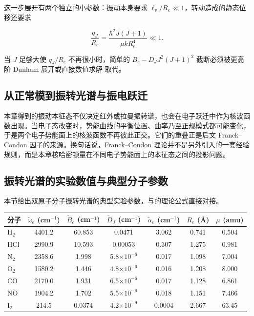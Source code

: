 这一步展开有两个独立的小参数：振动本身要求 \(\ell_v/R_e\ll1\)，转动造成的静态位移还要求

\begin{equation}
\frac{q_J}{R_e}
=\frac{\hbar^2J(J+1)}{\mu kR_e^4}\ll1.
\label{eq:centrifugal-control-parameter}
\end{equation}

当 \(J\) 足够大使 \(q_J/R_e\) 不再很小时，简单的 \(B_e-D_JJ^2(J+1)^2\) 截断必须被更高阶 Dunham 展开或直接数值求解  取代。

\subsection{从正常模到振转光谱与振电跃迁}

本章得到的振动本征态不仅决定红外或拉曼振转谱，也会在电子跃迁中作为核波函数出现。当电子态改变时，势能曲线的平衡位置、曲率乃至正规模式都可能变化，于是两个电子势能面上的核波函数不再彼此正交。它们的重叠正是后文 Franck--Condon 因子的来源。换句话说，Franck--Condon 理论并不是另外引入的一套经验规则，而是本章核哈密顿量在不同电子势能面上的本征态之间的投影问题。

\subsection{振转光谱的实验数值与典型分子参数}\label{sec:rovib-experiments}

本节给出双原子分子振转光谱的典型实验参数，与的理论公式直接对接。

\begin{center}
\begin{tabular}{lcccccc}
\hline
分子 & \(\tilde\omega_e\) (cm\(^{-1}\)) & \(\tilde B_e\) (cm\(^{-1}\)) & \(\tilde D_J\) (cm\(^{-1}\)) & \(\tilde\alpha_e\) (cm\(^{-1}\)) & \(R_e\) (\AA) & \(\mu\) (amu) \\
\hline
H\(_2\) & 4401.2 & 60.853 & 0.0471 & 3.062 & 0.741 & 0.504 \\
HCl & 2990.9 & 10.593 & 0.00053 & 0.307 & 1.275 & 0.981 \\
N\(_2\) & 2358.6 & 1.998 & 5.8\(\times10^{-6}\) & 0.017 & 1.098 & 7.004 \\
O\(_2\) & 1580.2 & 1.446 & 4.8\(\times10^{-6}\) & 0.016 & 1.208 & 8.000 \\
CO & 2170.0 & 1.931 & 6.5\(\times10^{-6}\) & 0.017 & 1.128 & 6.861 \\
NO & 1904.2 & 1.702 & 5.5\(\times10^{-6}\) & 0.018 & 1.151 & 7.466 \\
I\(_2\) & 214.5 & 0.0374 & 4.2\(\times10^{-9}\) & 0.0004 & 2.667 & 63.45 \\
\hline
\end{tabular}
\end{center}

